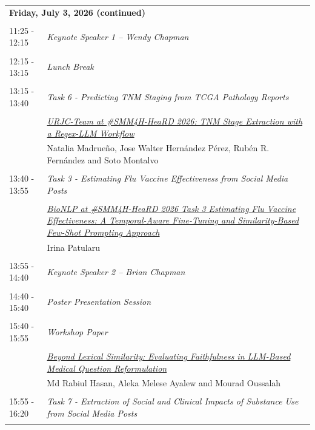 \documentclass[11pt,oneside]{book}
\begin{document}
          \begin{tabular}{p{24mm}p{124mm}}
    \multicolumn{2}{l}{\bf Friday, July 3, 2026 (continued)} \\\\
                11:25 - 12:15 & \emph{Keynote Speaker 1 -- Wendy Chapman}\\\\
      
                      12:15 - 13:15 & \emph{Lunch Break}\\\\
      
                      13:15 - 13:40 & \emph{Task 6 - Predicting TNM Staging from TCGA Pathology Reports}\\\\
      
                
                      & \hyperlink{page.133}{\emph{URJC-Team at \#SMM4H-HeaRD 2026: TNM Stage Extraction with a Regex-LLM Workflow}}\\
        & Natalia Madrueño\index{Madrueño}, Jose Walter Hernández Pérez\index{Pérez}, Rubén R. Fernández\index{Fernández} and Soto Montalvo\index{Montalvo}\\\\
                      13:40 - 13:55 & \emph{Task 3 - Estimating Flu Vaccine Effectiveness from Social Media Posts}\\\\
      
                
                      & \hyperlink{page.252}{\emph{BioNLP at \#SMM4H-HeaRD 2026 Task 3 Estimating Flu Vaccine Effectiveness: A Temporal-Aware Fine-Tuning and Similarity-Based Few-Shot Prompting Approach}}\\
        & Irina Patularu\index{Patularu}\\\\
                      13:55 - 14:40 & \emph{Keynote Speaker 2 -- Brian Chapman}\\\\
      
                      14:40 - 15:40 & \emph{Poster Presentation Session}\\\\
      
                      15:40 - 15:55 & \emph{Workshop Paper}\\\\
      
                
                      & \hyperlink{page.93}{\emph{Beyond Lexical Similarity: Evaluating Faithfulness in LLM-Based Medical Question Reformulation}}\\
        & Md Rabiul Hasan\index{Hasan}, Aleka Melese Ayalew\index{Ayalew} and Mourad Oussalah\index{Oussalah}\\\\
                      15:55 - 16:20 & \emph{Task 7 - Extraction of Social and Clinical Impacts of Substance Use from Social Media Posts}\\\\
      

\end{tabular}
\end{document}
